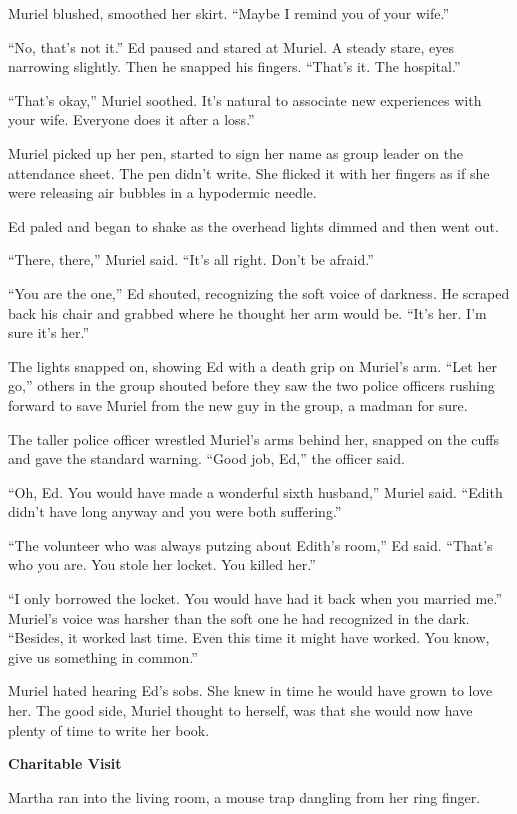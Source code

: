 \documentclass[
]{article}
\begin{document}
Muriel blushed, smoothed her skirt. ``Maybe I remind you of your wife.''

``No, that's not it.'' Ed paused and stared at Muriel. A steady stare,
eyes narrowing slightly. Then he snapped his fingers. ``That's it. The
hospital.''

``That's okay,'' Muriel soothed. It's natural to associate new
experiences with your wife. Every­one does it after a loss.''

Muriel picked up her pen, started to sign her name as group leader on
the attendance sheet. The pen didn't write. She flicked it with her
fingers as if she were releasing air bubbles in a hypodermic needle.

Ed paled and began to shake as the overhead lights dimmed and then went
out.

``There, there,'' Muriel said. ``It's all right. Don't be afraid.''

``You are the one,'' Ed shouted, recognizing the soft voice of darkness.
He scraped back his chair and grabbed where he thought her arm would be.
``It's her. I'm sure it's her.''

The lights snapped on, showing Ed with a death grip on Muriel's arm.
``Let her go,'' others in the group shouted before they saw the two
police officers rushing forward to save Muriel from the new guy in the
group, a madman for sure.

The taller police officer wrestled Muriel's arms behind her, snapped on
the cuffs and gave the standard warning. ``Good job, Ed,'' the officer
said.

``Oh, Ed. You would have made a wonderful sixth husband,'' Muriel said.
``Edith didn't have long anyway and you were both suffering.''

``The volunteer who was always putzing about Edith's room,'' Ed said.
``That's who you are. You stole her locket. You killed her.''

``I only borrowed the locket. You would have had it back when you
married me.'' Muriel's voice was harsher than the soft one he had
recognized in the dark. ``Besides, it worked last time. Even this time
it might have worked. You know, give us something in common.''

Muriel hated hearing Ed's sobs. She knew in time he would have grown to
love her. The good side, Muriel thought to herself, was that she would
now have plenty of time to write her book.

\textbf{Charitable Visit}

Martha ran into the living room, a mouse trap dangling from her ring
finger.
\end{document}
